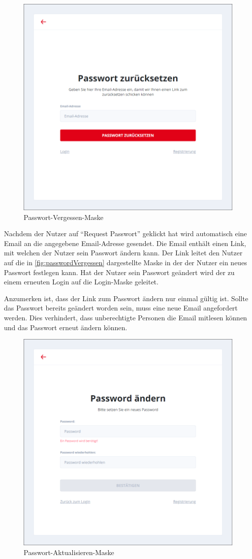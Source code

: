 \begin{figure}[h]
    \centering
    \includegraphics[width=.7\textwidth]{img/Passwort_zuruecksetzen.png}
    \caption{Passwort-Vergessen-Maske}
    \label{fig:passwordVergessen}
\end{figure}

Nachdem der Nutzer auf \enquote{Request Passwort} geklickt hat wird automatisch eine Email an die angegebene Email-Adresse gesendet.
Die Email enthält einen Link, mit welchen der Nutzer sein Passwort ändern kann.
Der Link leitet den Nutzer auf die in \autoref{fig:passwordVergessen} dargestellte Maske in der der Nutzer ein neues  Passwort festlegen kann. Hat der Nutzer sein Passwort geändert wird der zu einem erneuten Login auf die Login-Maske geleitet.

Anzumerken ist, dass der Link zum Passwort ändern nur einmal gültig ist.
Sollte das Passwort bereits geändert worden sein, muss eine neue Email angefordert werden.
Dies verhindert, dass unberechtigte Personen die Email mitlesen können und das Passwort erneut ändern können.


\begin{figure}[h]
    \centering
    \includegraphics[width=.7\textwidth]{img/passwordReset2.png}
    \caption{Passwort-Aktualisieren-Maske}
    \label{fig:passwordVergessen2}
\end{figure}

